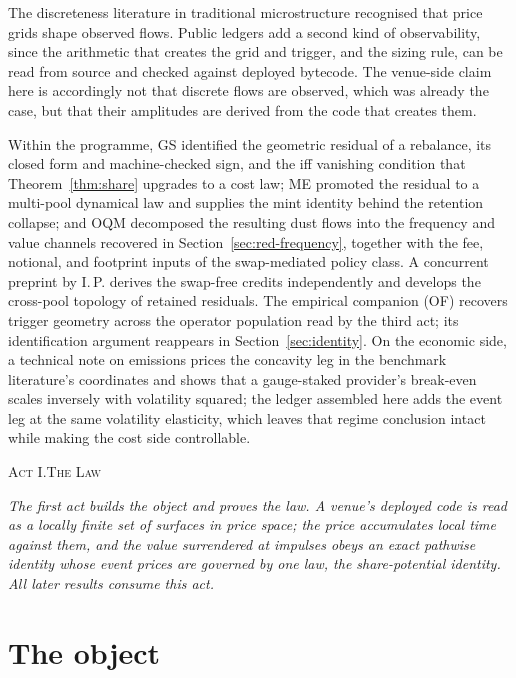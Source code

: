 \documentclass[11pt,a4paper]{article}
\theoremstyle{definition}
\theoremstyle{plain}
\theoremstyle{remark}
\newcommand{\actdivider}[2]{%
  \par\vspace{18pt plus 4pt minus 2pt}%
  \begin{center}{\fontsize{12.5pt}{15pt}\selectfont\scshape #1.\quad #2}\end{center}%
  \vspace{2pt}}
\begin{document}
The discreteness literature in traditional microstructure\cite{harris1991,gottliebkalay1985} recognised that price grids shape observed flows. Public ledgers add a second kind of
observability, since the arithmetic that creates the grid and trigger, and the sizing rule, can be read from source and checked against deployed bytecode. The venue-side claim here is accordingly 
not that discrete flows are observed, which was already the case, but that their amplitudes are derived from the code that creates them.

Within the programme, GS identified the geometric residual of a rebalance, its closed form and machine-checked sign, and the iff vanishing condition that Theorem~\ref{thm:share} upgrades to a
cost law; ME promoted the residual to a multi-pool dynamical law and supplies the mint identity behind the retention collapse; and OQM decomposed the resulting dust flows into the frequency and
value channels recovered in Section~\ref{sec:red-frequency}, together with the fee, notional, and footprint inputs of the swap-mediated policy class. A concurrent preprint by 
I.\,P.\cite{pi2026convexity} derives the swap-free credits independently and develops the cross-pool topology of retained residuals. The empirical companion\cite{ryan2026fingerprint} (OF)
recovers trigger geometry across the operator population read by the third act; its identification argument reappears in Section~\ref{sec:identity}. On the economic side, a technical note
on emissions\cite{ryan2026lvr} prices the concavity leg in the benchmark literature's coordinates and shows that a gauge-staked provider's break-even scales inversely with volatility squared; the
ledger assembled here adds the event leg at the same volatility elasticity, which leaves that regime conclusion intact while making the cost side controllable.

\actdivider{Act I}{The Law}

\noindent\emph{The first act builds the object and proves the law. A venue's deployed code is read as a locally finite set of surfaces in price space; the price accumulates 
local time against them, and the value surrendered at impulses obeys an exact pathwise identity whose event prices are governed by one law, the share-potential identity.
All later results consume this act.}

\section{The object}\label{sec:setting}
\end{document}
